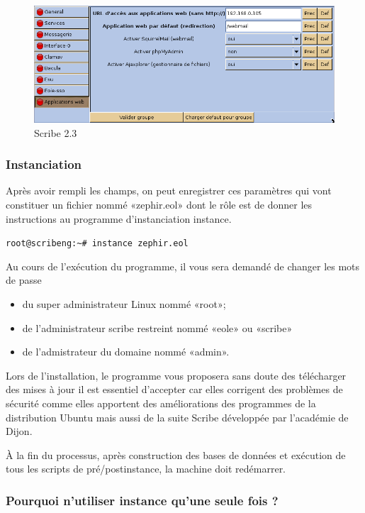\documentclass{article}
\makeatletter
\def\maxwidth{\ifdim\Gin@nat@width>\linewidth\linewidth
\else\Gin@nat@width\fi}
\let\Oldincludegraphics\includegraphics
\renewcommand{\includegraphics}[1]{\Oldincludegraphics[width=\maxwidth]{#1}}
\makeatother
\begin{document}
\begin{figure}[htbp]
\centering
\includegraphics{scribe_html_m6ec096b1.png}
\caption{Scribe 2.3 \label{m6ec096b1}}
\end{figure}

\subsubsection{Instanciation}

Après avoir rempli les champs, on peut enregistrer ces paramètres qui
vont constituer un fichier nommé «zephir.eol» dont le rôle est de donner
les instructions au programme d'instanciation instance.

\lstinline!root@scribeng:~# instance zephir.eol!

Au cours de l'exécution du programme, il vous sera demandé de changer
les mots de passe

\begin{itemize}
\item
  du super administrateur Linux nommé «root»;
\item
  de l'administrateur scribe restreint nommé «eole» ou «scribe»
\item
  de l'admistrateur du domaine nommé «admin».
\end{itemize}
Lors de l'installation, le programme vous proposera sans doute des
télécharger des mises à jour il est essentiel d'accepter car elles
corrigent des problèmes de sécurité comme elles apportent des
améliorations des programmes de la distribution Ubuntu mais aussi de la
suite Scribe développée par l'académie de Dijon.

À la fin du processus, après construction des bases de données et
exécution de tous les scripts de pré/postinstance, la machine doit
redémarrer.

\subsubsection{Pourquoi n'utiliser instance qu'une seule fois ?}
\end{document}
